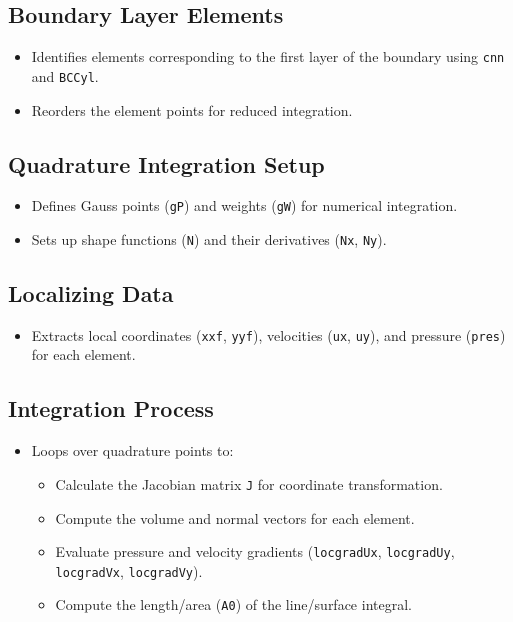 \documentclass[a4paper,12pt]{article} %
\begin{document}
\subsection*{Boundary Layer Elements}
\begin{itemize}
    \item Identifies elements corresponding to the first layer of the boundary using \texttt{cnn} and \texttt{BCCyl}.
    \item Reorders the element points for reduced integration.
\end{itemize}

\subsection*{Quadrature Integration Setup}
\begin{itemize}
    \item Defines Gauss points (\texttt{gP}) and weights (\texttt{gW}) for numerical integration.
    \item Sets up shape functions (\texttt{N}) and their derivatives (\texttt{Nx}, \texttt{Ny}).
\end{itemize}

\subsection*{Localizing Data}
\begin{itemize}
    \item Extracts local coordinates (\texttt{xxf}, \texttt{yyf}), velocities (\texttt{ux}, \texttt{uy}), and pressure (\texttt{pres}) for each element.
\end{itemize}

\subsection*{Integration Process}
\begin{itemize}
    \item Loops over quadrature points to:
    \begin{itemize}
        \item Calculate the Jacobian matrix \texttt{J} for coordinate transformation.
        \item Compute the volume and normal vectors for each element.
        \item Evaluate pressure and velocity gradients (\texttt{locgradUx}, \texttt{locgradUy}, \texttt{locgradVx}, \texttt{locgradVy}).
        \item Compute the length/area (\texttt{A0}) of the line/surface integral.
    \end{itemize}
\end{itemize}
\end{document}
